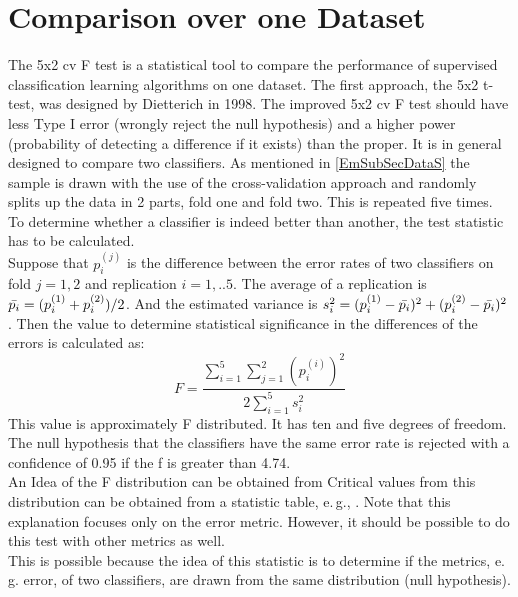 \section{Comparison over one Dataset}\label{EmSecOneData}
The 5x2 cv F test is a statistical tool to compare the performance of supervised classification learning algorithms on one dataset. \cite{Chen.2009}
The first approach, the 5x2 t-test, was designed by Dietterich in 1998. \cite{Dietterich.1998}
The improved 5x2 cv F test should have less Type I error (wrongly reject the null hypothesis) and a higher power (probability of detecting a difference if it exists) than the proper.\cite{Alpaydm.1999}
It is in general designed to compare two classifiers.
As mentioned in \ref{EmSubSecDataS} the sample is drawn with the use of the cross-validation approach and randomly splits up the data in 2 parts, fold one and fold two.
This is repeated five times. 
To determine whether a classifier is indeed better than another, the test statistic has to be calculated.\\
Suppose that $p_i^{(j)}$ is the difference between the error rates of two classifiers on fold $j = 1,2$ and replication $i=1,..5$.
The average of a replication is $\bar{p_i} = (p_i^{(1)}+p_i^{(2)})/2$.
And the estimated variance is $s_i^2=(p_i^{(1)}-\bar{p_i})^2+(p_i^{(2)}-\bar{p_i})^2$.
Then the value to determine statistical significance in the differences of the errors is calculated as:
\begin{equation}
	F = \frac{\sum_{i=1}^{5}\sum_{j=1}^{2}(p_i^{(i)})^2}{2\sum_{i=1}^{5}s_i^2}
\end{equation}
This value is approximately F distributed. It has ten and five degrees of freedom.
The null hypothesis that the classifiers have the same error rate is rejected with a confidence of 0.95 if the f is greater than 4.74. \\
An Idea of the F distribution can be obtained from \cite[p. 338-340]{Teschl.2014}
Critical values from this distribution can be obtained from a statistic table, e.\,g., \cite[p. 591]{Bortz.2010}.
Note that this explanation focuses only on the error metric.
However, it should be possible to do this test with other metrics as well.\\
This is possible because the idea of this statistic is to determine if the metrics, e.\,g. error, of two classifiers, are drawn from the same distribution (null hypothesis).\cite{Alpaydm.1999}

